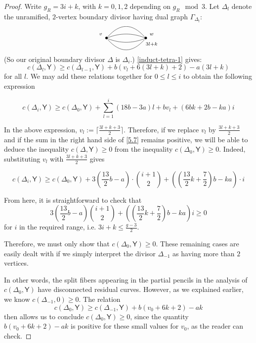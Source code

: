 \documentclass[reqno, 10 pt]{article}
\theoremstyle{definition}
\theoremstyle{remark}
\numberwithin{equation}{section}
\numberwithin{thm}{section}
\numberwithin{prop}{section}
\numberwithin{lem}{section}
\numberwithin{cor}{section}
\numberwithin{conj}{section}
\numberwithin{defn}{section}
\newcommand{\sfY}{{\mathsf Y}}
\begin{document}
\begin{proof}
  Write $g_R = 3i+k$, with $k=0,1,2$ depending on $g_R\mod 3$.  Let $\Delta_l$ denote the unramified, $2$-vertex boundary divisor having dual graph $\Gamma_{\Delta_{l}}$:\[  \xygraph{
!{<0cm,0cm>;<1cm,0cm>:<0cm,1cm>::}
!{(0,0) }*{\bullet}="l"!{(-.3,.2)}{\scriptstyle v}!{(-.3,-.3)}
!{(2,0) }*{\bullet}="r"!{(2.3,.2)}{\scriptstyle w}!{(2.3,-.3)}{\scriptstyle 3l+k}
 "l"-@/^.6cm/"r"  
"l"-@/^/"r" 
"l"-@/_/"r"
"l"-@/_.6cm/"r" 
}  \]  (So our original boundary divisor $\Delta$ is $\Delta_i$.) \autoref{induct-tetra-1} gives: \[c(\Delta_l, {\sfY}) \geq c(\Delta_{l-1}, {\sfY}) + b(v_l + 6(3l+k) +2)-a(3l+k)\] for all $l$.  We may add these relations together for $0 \leq l \leq i$ to obtain the following expression 


\begin{equation}\label{5.7}
c(\Delta_{i}, {\sfY}) \geq c(\Delta_{0}, {\sfY}) +  \displaystyle{\sum_{l=1}^{i}(18b-3a)l} +bv_{l} + (6bk+2b-ka)i
\end{equation}


In the above expression,  $v_l := \lceil{\frac{3l+k+3}{2}\rceil}$.  Therefore, if we replace $v_l$ by $\frac{3l+k+3}{2}$ and if the sum in the right hand side of \eqref{5.7} remains positive, we will be able to deduce the inequality $c(\Delta, \sfY) \geq 0$ from the inequality $c(\Delta_{0}, {\sfY}) \geq 0$.  Indeed, substituting $v_l$ with $\frac{3l+k+3}{2}$  gives


\begin{equation}
c(\Delta_{i}, {\sfY}) \geq c(\Delta_{0}, {\sfY}) + 3\left(\frac{13}{2}b-a\right)\cdot {i+1 \choose 2} +  \left(\left(\frac{13}{2}k+\frac{7}{2}\right)b-ka\right)\cdot i  
\end{equation} 


From here, it is straightforward to check that \[ 3\left(\frac{13}{2}b-a\right) {i+1 \choose 2} +  \left(\left(\frac{13}{2}k+\frac{7}{2}\right)b-ka\right)i  \geq 0\] for $i$ in the required range, i.e. $3i+k \leq \frac{g-3}{2}$.

Therefore, we must only show that $c(\Delta_{0}, {\sfY}) \geq 0$.  These remaining cases are easily dealt with if we simply interpret the divisor $\Delta_{-1}$ as having more than $2$ vertices. 

 In other words, the split fibers appearing in the partial pencils in the analysis of $c(\Delta_{0},\sfY)$ have disconnected residual curves. However, as we explained earlier, we know $c(\Delta_{-1},0) \geq 0$.  The relation \[c(\Delta_0, {\sfY}) \geq c(\Delta_{-1}, {\sfY}) + b(v_0 + 6k +2)-ak\] then allows us to conclude $c(\Delta_0, {\sfY})\geq 0$, since the quantity $b(v_{0} + 6k +2) - ak$ is positive for these small values for $v_{0}$, as the reader can check.

\end{proof}
\end{document}
